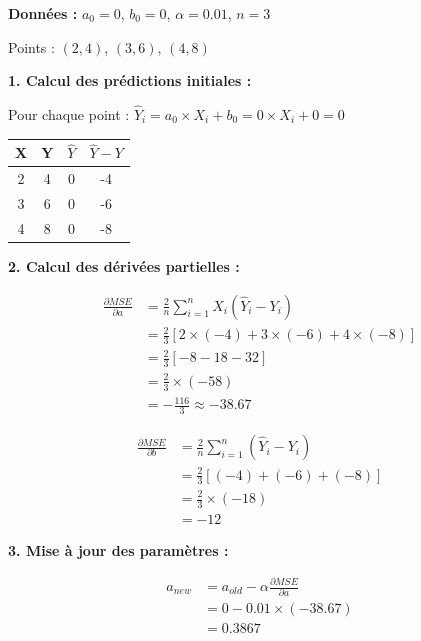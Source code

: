\documentclass[11pt,a4paper]{article}
\begin{document}
\begin{solutionbox}
\textbf{Données :} $a_0 = 0$, $b_0 = 0$, $\alpha = 0.01$, $n = 3$

Points : $(2, 4)$, $(3, 6)$, $(4, 8)$

\textbf{1. Calcul des prédictions initiales :}

Pour chaque point : $\hat{Y}_i = a_0 \times X_i + b_0 = 0 \times X_i + 0 = 0$

\begin{center}
\begin{tabular}{|c|c|c|c|}
\hline
\textbf{X} & \textbf{Y} & \textbf{$\hat{Y}$} & \textbf{$\hat{Y} - Y$} \\
\hline
2 & 4 & 0 & -4 \\
3 & 6 & 0 & -6 \\
4 & 8 & 0 & -8 \\
\hline
\end{tabular}
\end{center}

\textbf{2. Calcul des dérivées partielles :}

\begin{align*}
\frac{\partial MSE}{\partial a} &= \frac{2}{n}\sum_{i=1}^{n}X_i(\hat{Y}_i - Y_i) \\
                                 &= \frac{2}{3}[2 \times (-4) + 3 \times (-6) + 4 \times (-8)] \\
                                 &= \frac{2}{3}[-8 - 18 - 32] \\
                                 &= \frac{2}{3} \times (-58) \\
                                 &= -\frac{116}{3} \approx -38.67
\end{align*}

\begin{align*}
\frac{\partial MSE}{\partial b} &= \frac{2}{n}\sum_{i=1}^{n}(\hat{Y}_i - Y_i) \\
                                 &= \frac{2}{3}[(-4) + (-6) + (-8)] \\
                                 &= \frac{2}{3} \times (-18) \\
                                 &= -12
\end{align*}

\textbf{3. Mise à jour des paramètres :}

\begin{align*}
a_{new} &= a_{old} - \alpha \frac{\partial MSE}{\partial a} \\
        &= 0 - 0.01 \times (-38.67) \\
        &= 0.3867
\end{align*}


\end{solutionbox}
\end{document}
